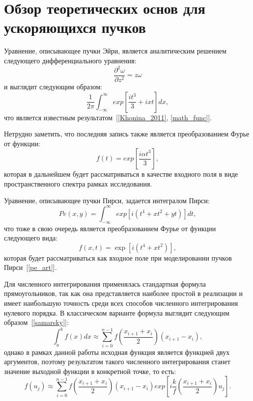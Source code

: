     \section{Обзор теоретических основ для ускоряющихся пучков}
    {
    Уравнение, описывающее пучки Эйри, является аналитическим решением
    следующего дифференциального уравнения:
    \begin{equation*}
        \label{1}
        \frac{\partial^2 \omega}{\partial z^2} = z \omega
    \end{equation*}
    и выглядит следующим образом:
    \begin{equation*}
        \label{2}
        \frac{1 }{2 \pi}\int_{- \infty}^{\infty} exp[{\frac{it^3}{3} + ixt}]dx,
    \end{equation*}
    что является известным результатом~[\ref{Khonina_2011}, \ref{math_func}].

    Нетрудно заметить, что последняя запись также является
    преобразованием Фурье от функции:
    \begin{equation*}
        \label{3}
        f(t) = exp[\frac{i \alpha t^3}{3}],
    \end{equation*}
    которая в дальнейшем будет рассматриваться в качестве входного поля в виде пространственного спектра
    рамках исследования.

    Уравнение, описывающее пучки Пирси, задается интегралом Пирси:
    \begin{equation*}
        \label{4}
        Pe(x, y)  = \int_{-\infty}^{\infty}exp[i(t^4 + xt^2 +yt)]dt,
    \end{equation*}
    что тоже в свою очередь является преобразованием Фурье от функции
    следующего вида:
    \begin{equation*}
        \label{5}
        f(x, t)  = \exp[i(t^4 + xt^2)],
    \end{equation*}
    которая будет рассматриваться как входное поле при моделировании пучков
    Пирси~[\ref{pe_art}].

    Для численного интегрирования применялась стандартная формула
    прямоугольников, так как она представляется наиболее простой в реализации и
    имеет наибольшую точность среди всех способов численного интегрирования
    нулевого порядка. В классическом варианте формула выглядит следующим
    образом~[\ref{samarsky}]:
    \begin{equation*}
        \label{6}
        \int_a^b{f(x)dx} \approx \sum_{i=0}^{n-1} f(\frac{x_{i+1} + x_i}{2})(x_{i+1} - x_i),
    \end{equation*}
    однако в рамках данной работы исходная функция является функцией двух аргументов,
    поэтому результатом такого численного интегрирования станет значение
    выходной функции в конкретной точке, то есть:
    \begin{equation*}
        \label{7}
        f(u_j) \approx \sum_{i=0}^{n-1}f(\frac{x_{i+1}+x_i}{2})(x_{i+1} - x_i) exp[i \frac{k}{f}(\frac{x_{i+1}+x_i}{2})u_j].
    \end{equation*}

}
